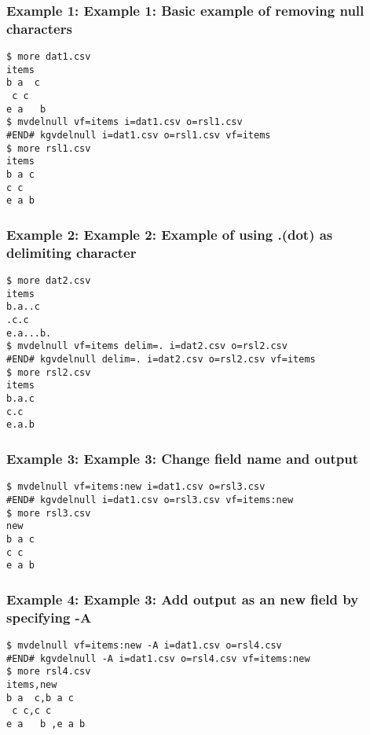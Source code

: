 \subsubsection*{Example 1: Example 1: Basic example of removing null characters}



\begin{Verbatim}[baselinestretch=0.7,frame=single]
$ more dat1.csv
items
b a  c
 c c
e a   b 
$ mvdelnull vf=items i=dat1.csv o=rsl1.csv
#END# kgvdelnull i=dat1.csv o=rsl1.csv vf=items
$ more rsl1.csv
items
b a c
c c
e a b
\end{Verbatim}
\subsubsection*{Example 2: Example 2: Example of using .(dot) as delimiting character}



\begin{Verbatim}[baselinestretch=0.7,frame=single]
$ more dat2.csv
items
b.a..c
.c.c
e.a...b.
$ mvdelnull vf=items delim=. i=dat2.csv o=rsl2.csv
#END# kgvdelnull delim=. i=dat2.csv o=rsl2.csv vf=items
$ more rsl2.csv
items
b.a.c
c.c
e.a.b
\end{Verbatim}
\subsubsection*{Example 3: Example 3: Change field name and output }



\begin{Verbatim}[baselinestretch=0.7,frame=single]
$ mvdelnull vf=items:new i=dat1.csv o=rsl3.csv
#END# kgvdelnull i=dat1.csv o=rsl3.csv vf=items:new
$ more rsl3.csv
new
b a c
c c
e a b
\end{Verbatim}
\subsubsection*{Example 4: Example 3: Add output as an new field by specifying -A}



\begin{Verbatim}[baselinestretch=0.7,frame=single]
$ mvdelnull vf=items:new -A i=dat1.csv o=rsl4.csv
#END# kgvdelnull -A i=dat1.csv o=rsl4.csv vf=items:new
$ more rsl4.csv
items,new
b a  c,b a c
 c c,c c
e a   b ,e a b
\end{Verbatim}
